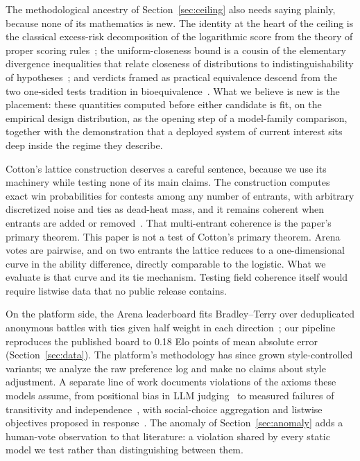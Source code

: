 \documentclass[10pt]{article}
\begin{document}
The methodological ancestry of Section~\ref{sec:ceiling} also needs
saying plainly, because none of its mathematics is new. The identity
at the heart of the ceiling is the classical excess-risk decomposition
of the logarithmic score from the theory of proper scoring
rules~\citep{gneitingraftery2007}; the uniform-closeness bound is a
cousin of the elementary divergence inequalities that relate closeness
of distributions to indistinguishability of
hypotheses~\citep{coverthomas2006, lecam1986}; and verdicts framed as
practical equivalence descend from the two one-sided tests tradition
in bioequivalence~\citep{schuirmann1987}. What we believe is new is
the placement: these quantities computed before either candidate is
fit, on the empirical design distribution, as the opening step of a
model-family comparison, together with the demonstration that a deployed system of
current interest sits deep inside the regime they describe.

Cotton's lattice construction deserves a careful sentence, because we
use its machinery while testing none of its main claims. The
construction computes exact win probabilities for contests among any
number of entrants, with arbitrary discretized noise and ties as
dead-heat mass, and it remains coherent when entrants are added or
removed~\citep{cotton2021}. That multi-entrant coherence is the
paper's primary theorem. This paper is not a test of Cotton's primary
theorem. Arena votes are pairwise, and on two entrants the lattice
reduces to a one-dimensional curve in the ability difference, directly
comparable to the logistic. What we evaluate is that curve and its tie
mechanism. Testing field coherence itself would require listwise data
that no public release contains.

On the platform side, the Arena leaderboard fits Bradley--Terry over
deduplicated anonymous battles with ties given half weight in each
direction~\citep{chiang2024arena}; our pipeline reproduces the
published board to 0.18 Elo points of mean absolute error
(Section~\ref{sec:data}). The platform's methodology has since grown
style-controlled variants; we analyze the raw preference log and make
no claims about style adjustment. A separate line of work documents
violations of the axioms these models assume, from positional bias in
LLM judging~\citep{tang2023} to measured failures of transitivity and
independence~\citep{zhao2024}, with social-choice aggregation and
listwise objectives proposed in response~\citep{potyka2023,
liu2024lipo}. The anomaly of Section~\ref{sec:anomaly} adds a
human-vote observation to that literature: a violation shared by every
static model we test rather than distinguishing between them.
\end{document}
